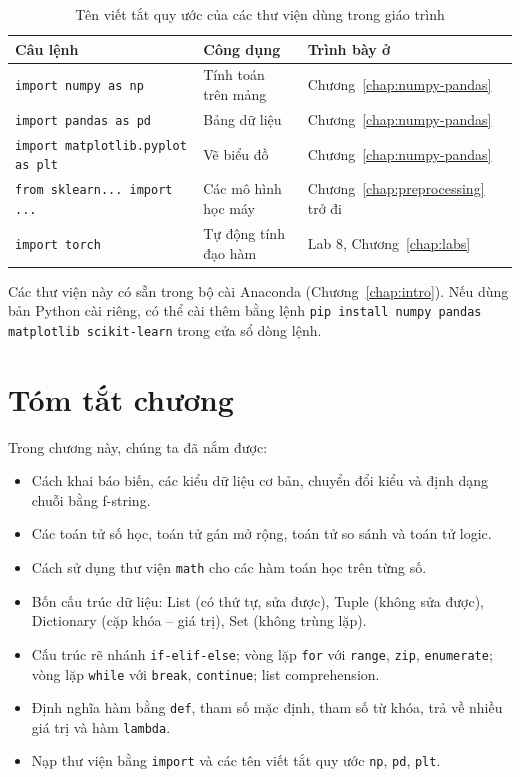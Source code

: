 \begin{table}[H]
\centering
\begin{tabular}{|p{6.4cm}|p{3.6cm}|p{3.8cm}|}
\hline
\textbf{Câu lệnh} & \textbf{Công dụng} & \textbf{Trình bày ở} \\
\hline
\texttt{import numpy as np} & Tính toán trên mảng & Chương~\ref{chap:numpy-pandas} \\
\hline
\texttt{import pandas as pd} & Bảng dữ liệu & Chương~\ref{chap:numpy-pandas} \\
\hline
\texttt{import matplotlib.pyplot as plt} & Vẽ biểu đồ & Chương~\ref{chap:numpy-pandas} \\
\hline
\texttt{from sklearn... import ...} & Các mô hình học máy & Chương~\ref{chap:preprocessing} trở đi \\
\hline
\texttt{import torch} & Tự động tính đạo hàm & Lab 8, Chương~\ref{chap:labs} \\
\hline
\end{tabular}
\caption{Tên viết tắt quy ước của các thư viện dùng trong giáo trình}
\end{table}

Các thư viện này có sẵn trong bộ cài Anaconda (Chương~\ref{chap:intro}). Nếu dùng bản Python cài riêng, có thể cài thêm bằng lệnh \texttt{pip install numpy pandas matplotlib scikit-learn} trong cửa sổ dòng lệnh.

\section{Tóm tắt chương}
Trong chương này, chúng ta đã nắm được:
\begin{itemize}
    \item Cách khai báo biến, các kiểu dữ liệu cơ bản, chuyển đổi kiểu và định dạng chuỗi bằng f-string.
    \item Các toán tử số học, toán tử gán mở rộng, toán tử so sánh và toán tử logic.
    \item Cách sử dụng thư viện \texttt{math} cho các hàm toán học trên từng số.
    \item Bốn cấu trúc dữ liệu: List (có thứ tự, sửa được), Tuple (không sửa được), Dictionary (cặp khóa -- giá trị), Set (không trùng lặp).
    \item Cấu trúc rẽ nhánh \texttt{if-elif-else}; vòng lặp \texttt{for} với \texttt{range}, \texttt{zip}, \texttt{enumerate}; vòng lặp \texttt{while} với \texttt{break}, \texttt{continue}; list comprehension.
    \item Định nghĩa hàm bằng \texttt{def}, tham số mặc định, tham số từ khóa, trả về nhiều giá trị và hàm \texttt{lambda}.
    \item Nạp thư viện bằng \texttt{import} và các tên viết tắt quy ước \texttt{np}, \texttt{pd}, \texttt{plt}.
\end{itemize}

